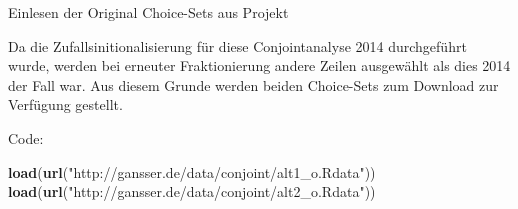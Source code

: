 \documentclass[12pt,ngerman,a4paper,ignorenonframetext,]{beamer}
\newenvironment{Shaded}{\begin{snugshade}}{\end{snugshade}}
\newcommand{\KeywordTok}[1]{\textcolor[rgb]{0.13,0.29,0.53}{\textbf{#1}}}
\newcommand{\NormalTok}[1]{#1}
\newcommand{\StringTok}[1]{\textcolor[rgb]{0.31,0.60,0.02}{#1}}
\begin{document}
\begin{frame}[fragile]{Einlesen der Original Choice-Sets aus Projekt}
\protect\hypertarget{einlesen-der-original-choice-sets-aus-projekt}{}

Da die Zufallsinitionalisierung für diese Conjointanalyse 2014
durchgeführt wurde, werden bei erneuter Fraktionierung andere Zeilen
ausgewählt als dies 2014 der Fall war. Aus diesem Grunde werden beiden
Choice-Sets zum Download zur Verfügung gestellt.

Code:

\begin{Shaded}
\begin{Highlighting}[]
\KeywordTok{load}\NormalTok{(}\KeywordTok{url}\NormalTok{(}\StringTok{"http://gansser.de/data/conjoint/alt1_o.Rdata"}\NormalTok{))}
\KeywordTok{load}\NormalTok{(}\KeywordTok{url}\NormalTok{(}\StringTok{"http://gansser.de/data/conjoint/alt2_o.Rdata"}\NormalTok{))}
\end{Highlighting}
\end{Shaded}

\end{frame}
\end{document}
